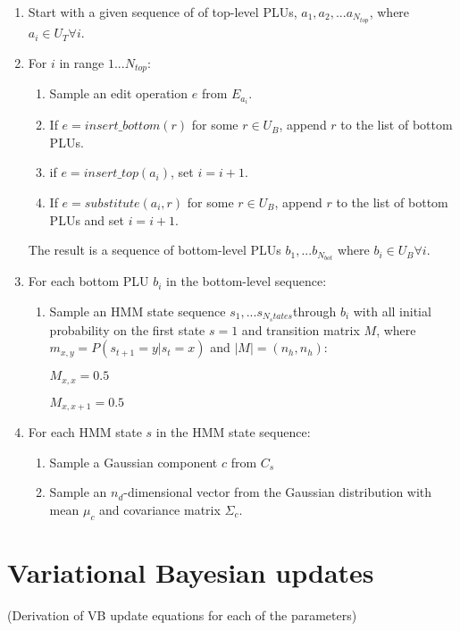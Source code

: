 \documentclass[11pt]{article}
\newcommand{\myindent}{\hspace{2cm}}
\begin{document}
\begin{enumerate}

\item Start with a given sequence of of top-level PLUs, $a_1, a_2, ... a_{N_{top}}$, where $a_i \in U_T \forall i$.

\item For $i$ in range $1...N_{top}$:
\begin{enumerate}
	\item Sample an edit operation $e$ from $E_{a_i}$.
	\item If $e = insert\_bottom(r)$ for some $r \in U_B$, append $r$ to the list of bottom PLUs.
	\item if $e = insert\_top(a_i)$, set $i=i+1$.
	\item If $e = substitute(a_i,r)$ for some $r \in U_B$, append $r$ to the list of bottom PLUs and set $i=i+1$.
\end{enumerate}

The result is a sequence of bottom-level PLUs $b_1,...b_{N_{bot}}$ where $b_i \in U_B \forall i$.

\item For each bottom PLU $b_i$ in the bottom-level sequence:
\begin{enumerate}
\item Sample an HMM state sequence $s_1,...s_{N_states}$through $b_i$ with all initial probability on the first state $s=1$ and transition matrix $M$, where $m_{x,y}=P(s_{t+1}=y|s_t=x)$ and $|M|=(n_h,n_h)$:

\myindent $M_{x,x}=0.5$

\myindent $M_{x,x+1}=0.5$

\end{enumerate}

\item For each HMM state $s$ in the HMM state sequence: 
\begin{enumerate}
\item Sample a Gaussian component $c$ from $C_s$

\item Sample an $n_d$-dimensional vector from the Gaussian distribution with mean $\mu_c$ and covariance matrix $\Sigma_c$.

\end{enumerate}

\end{enumerate}


\section{Variational Bayesian updates}
(Derivation of VB update equations for each of the parameters)
\end{document}
